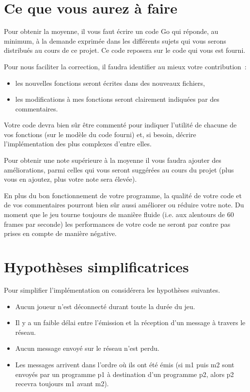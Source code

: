 \documentclass[a4paper]{article}
\begin{document}
\section{Ce que vous aurez à faire}

Pour obtenir la moyenne, il vous faut écrire un code Go qui réponde, au minimum, à la demande exprimée dans les différents sujets qui vous serons distribués au cours de ce projet.
Ce code reposera sur le code qui vous est fourni.

Pour nous faciliter la correction, il faudra identifier au mieux votre contribution~:
\begin{itemize}
  \item les nouvelles fonctions seront écrites dans des nouveaux fichiers,
  \item les modifications à mes fonctions seront clairement indiquées par des commentaires.
\end{itemize}
Votre code devra bien sûr être commenté pour indiquer l'utilité de chacune de vos fonctions (sur le modèle du code fourni) et, si besoin, décrire l'implémentation des plus complexes d'entre elles.

Pour obtenir une note supérieure à la moyenne il vous faudra ajouter des améliorations, parmi celles qui vous seront suggérées au cours du projet (plus vous en ajoutez, plus votre note sera élevée).

En plus du bon fonctionnement de votre programme, la qualité de votre code et de vos commentaires pourront bien sûr aussi améliorer ou réduire votre note. Du moment que le jeu tourne toujours de manière fluide (i.e. aux alentours de 60 frames par seconde) les performances de votre code ne seront par contre pas prises en compte de manière négative.

\section{Hypothèses simplificatrices}

Pour simplifier l'implémentation on considérera les hypothèses suivantes.

\begin{itemize}
\item Aucun joueur n'est déconnecté durant toute la durée du jeu.
\item Il y a un faible délai entre l'émission et la réception d'un message à travers le réseau.
\item Aucun message envoyé sur le réseau n'est perdu.
\item Les messages arrivent dans l'ordre où ils ont été émis (si m1 puis m2 sont envoyés par un programme p1 à destination d'un programme p2, alors p2 recevra toujours m1 avant m2).
\end{itemize}
\end{document}

